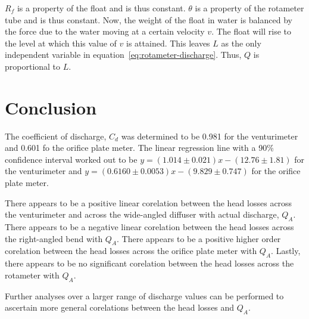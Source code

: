 \documentclass[a4paper]{article}
\begin{document}
$R_f$ is a property of the float and is thus constant. 
$\theta$ is a property of the rotameter tube and is thus constant.
Now, the weight of the float in water is balanced by 
the force due to the water moving at a certain velocity $v$.
The float will rise to the level at which this value of $v$ is attained.
This leaves $L$ as the only independent variable in 
equation~\eqref{eq:rotameter-discharge}. 
Thus, $Q$ is proportional to $L$.

\section{Conclusion}
The coefficient of discharge, $C_d$ was determined to be 
0.981 for the venturimeter and 0.601 fo the orifice plate meter.
The linear regression line with a 90\% confidence interval worked
out to be $y = (1.014 \pm 0.021)x - (12.76 \pm 1.81)$ for the
venturimeter and $y = (0.6160 \pm 0.0053)x - (9.829 \pm 0.747)$ for the
orifice plate meter.

There appears to be a positive linear corelation between the head losses across
the venturimeter and across the wide-angled diffuser with 
actual discharge, $Q_A$.
There appears to be a negative linear corelation between the head losses across
the right-angled bend with $Q_A$.
There appears to be a positive higher order corelation between the head losses 
across the orifice plate meter with $Q_A$.
Lastly, there appears to be no significant corelation between the head losses 
across the rotameter with $Q_A$.

Further analyses over a larger range of discharge values can be performed 
to ascertain more general corelations between the head losses and $Q_A$.
\end{document}
